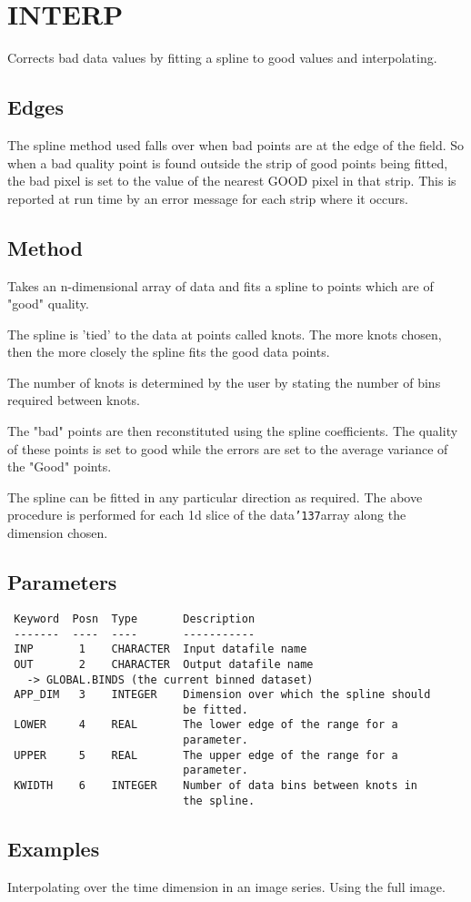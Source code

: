 \documentclass{book}
\renewcommand{\_}{{\tt\char'137}}     %
\begin{document}
\section{INTERP}
Corrects bad data values by fitting a spline to good values and
interpolating.

\subsection{Edges}
The spline method used falls over when bad points are at the edge
of the field. So when a bad quality point is found outside the
strip of good points being fitted, the bad pixel is set to the
value of the nearest GOOD pixel in that strip. This is reported
at run time by an error message for each strip where it occurs.

\subsection{Method}
Takes an n-dimensional array of data and fits a spline to points
which are of "good" quality.

The spline is 'tied' to the data at points called knots. The more
knots chosen, then the more closely the spline fits the good data
points.

The number of knots is determined by the user by stating the
number of bins required between knots.

The "bad" points are then reconstituted using the spline
coefficients. The quality of these points is set to good while
the errors are set to the average variance of the "Good" points.

The spline can be fitted in any particular direction as required.
The above procedure is performed for each 1d slice of the
data\_array along the dimension chosen.

\subsection{Parameters}
\begin{verbatim}
 Keyword  Posn  Type       Description
 -------  ----  ----       -----------
 INP       1    CHARACTER  Input datafile name
 OUT       2    CHARACTER  Output datafile name
   -> GLOBAL.BINDS (the current binned dataset)
 APP_DIM   3    INTEGER    Dimension over which the spline should
                           be fitted.
 LOWER     4    REAL       The lower edge of the range for a
                           parameter.
 UPPER     5    REAL       The upper edge of the range for a
                           parameter.
 KWIDTH    6    INTEGER    Number of data bins between knots in
                           the spline.

\end{verbatim}\subsection{Examples}
Interpolating over the time dimension in an image series. Using
the full image.
\end{document}
